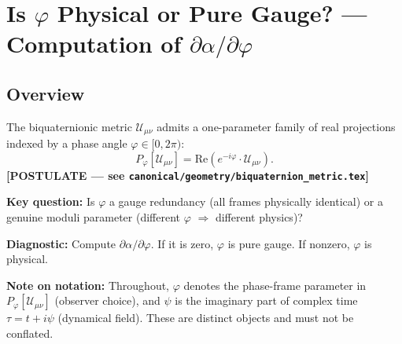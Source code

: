 %
%


\section{Is $\varphi$ Physical or Pure Gauge? — Computation of $\partial\alpha/\partial\varphi$}
\label{sec:phi_gauge_vs_physical}

\subsection{Overview}

The biquaternionic metric $\mathcal{U}_{\mu\nu}$ admits a one-parameter family of real
projections indexed by a phase angle $\varphi \in [0, 2\pi)$:
\begin{equation}
  P_\varphi[\mathcal{U}_{\mu\nu}] = \mathrm{Re}(e^{-i\varphi} \cdot \mathcal{U}_{\mu\nu}).
  \label{eq:phase_projection}
\end{equation}
\textbf{[POSTULATE — see \texttt{canonical/geometry/biquaternion\_metric.tex}]}

\noindent \textbf{Key question:} Is $\varphi$ a gauge redundancy (all frames physically identical)
or a genuine moduli parameter (different $\varphi$ $\Rightarrow$ different physics)?

\noindent \textbf{Diagnostic:} Compute $\partial\alpha/\partial\varphi$.  If it is zero,
$\varphi$ is pure gauge.  If nonzero, $\varphi$ is physical.

\noindent \textbf{Note on notation:} Throughout, $\varphi$ denotes the phase-frame parameter in
$P_\varphi[\mathcal{U}_{\mu\nu}]$ (observer choice), and $\psi$ is the imaginary part of complex
time $\tau = t + i\psi$ (dynamical field).  These are distinct objects and must not be conflated.


